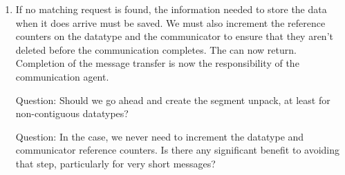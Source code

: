 \begin{enumerate}
\item If no matching request is found, the information needed to store the data
  when it does arrive must be saved.  We must also increment the reference
  counters on the datatype and the communicator to ensure that they aren't
  deleted before the communication completes.
  The  can now return.  Completion of the message transfer
  is now the responsibility of the communication agent. 

  Question: Should we go ahead and create the segment unpack, at least for 
  non-contiguous datatypes?

  Question: In the  case, we never need to increment the
  datatype and communicator reference counters.  Is there any significant 
  benefit to avoiding that step, particularly for very short messages?
\end{enumerate}




